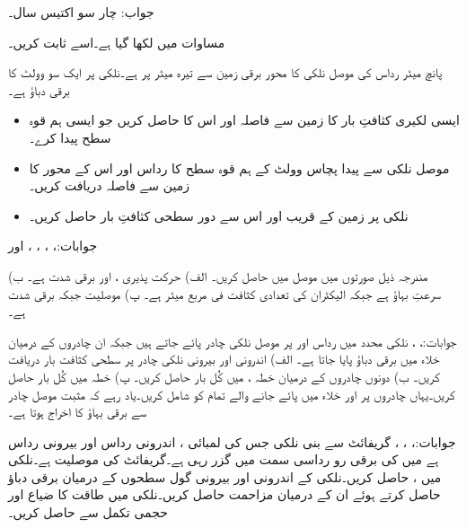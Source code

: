 جواب: چار سو اکتیس  سال۔ 

مساوات  میں   لکھا گیا ہے۔اسے ثابت کریں۔

پانچ میٹر رداس کی موصل نلکی کا محور برقی زمین سے تیرہ میٹر پر ہے۔نلکی پر ایک سو وولٹ کا برقی دباؤ ہے۔
\begin{itemize}
\item
ایسی لکیری کثافتِ بار کا زمین سے فاصلہ اور اس کا  حاصل کریں جو ایسی ہم قوہ سطح  پیدا کرے۔
\item
موصل نلکی سے پیدا پچاس وولٹ کے ہم قوہ سطح کا رداس اور اس کے محور کا زمین سے فاصلہ دریافت کریں۔
\item
نلکی پر زمین کے قریب اور اس سے دور سطحی کثافتِ بار حاصل کریں۔
\end{itemize} 

جوابات:، ، ، ،  اور 

مندرجہ ذیل صورتوں میں موصل میں  حاصل کریں۔ الف) حرکت پذیری ،  اور برقی شدت  ہے۔ ب) سرعتِ بہاؤ  ہے جبکہ الیکٹران کی تعدادی کثافت  فی مربع میٹر ہے۔ پ) موصلیت  جبکہ برقی شدت  ہے۔

جوابات:، ، 
نلکی محدد میں رداس  اور  پر موصل نلکی چادر پائے جاتے ہیں جبکہ ان چادروں کے درمیان خلاء میں  برقی دباؤ پایا جاتا ہے۔ الف) اندرونی اور بیرونی نلکی چادر پر سطحی کثافت بار دریافت کریں۔ ب) دونوں چادروں کے درمیان خطہ ،  میں کُل بار حاصل کریں۔ پ) خطہ  میں کُل بار حاصل کریں۔یہاں چادروں پر اور خلاء میں پائے جانے والے تمام کو شامل کریں۔یاد رہے کہ مثبت موصل چادر سے برقی بہاؤ کا اخراج ہوتا ہے۔

جوابات:، ، ، 
گریفائٹ سے بنی  نلکی جس کی لمبائی ، اندرونی رداس  اور بیرونی رداس  ہے میں  کی برقی رو رداسی سمت میں  گزر رہی ہے۔گریفائٹ  کی موصلیت  ہے۔نلکی میں ،  حاصل کریں۔نلکی کے اندرونی اور بیرونی گول سطحوں کے درمیان برقی دباؤ  حاصل کرتے ہوئے ان کے درمیان مزاحمت  حاصل کریں۔نلکی میں طاقت کا ضیاع  اور حجمی تکمل  سے حاصل کریں۔

